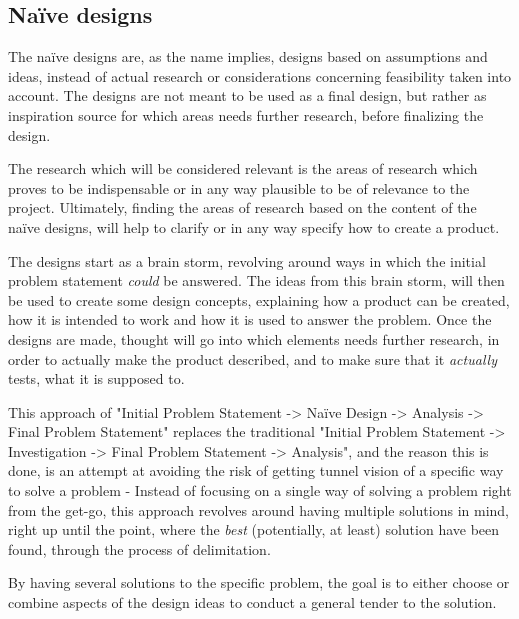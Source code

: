 
\subsection{Naïve designs}
The naïve designs are, as the name implies, designs based on assumptions and ideas, instead of actual research or considerations concerning feasibility taken into account. The designs are not meant to be used as a final design, but rather as inspiration source for which areas needs further research, before finalizing the design.

The research which will be considered relevant is the areas of research which proves to be indispensable or in any way plausible to be of relevance to the project. Ultimately, finding the areas of research based on the content of the naïve designs, will help to clarify or in any way specify how to create a product.
\bigskip

The designs start as a brain storm, revolving around ways in which the initial problem statement \textit{could} be answered. The ideas from this brain storm, will then be used to create some design concepts, explaining how a product can be created, how it is intended to work and how it is used to answer the problem. Once the designs are made, thought will go into which elements needs further research, in order to actually make the product described, and to make sure that it \textit{actually} tests, what it is supposed to.
\bigskip

This approach of "Initial Problem Statement -> Naïve Design -> Analysis -> Final Problem Statement" replaces the traditional "Initial Problem Statement -> Investigation -> Final Problem Statement -> Analysis", and the reason this is done, is an attempt at avoiding the risk of getting tunnel vision of a specific way to solve a problem - Instead of focusing on a single way of solving a problem right from the get-go, this approach revolves around having multiple solutions in mind, right up until the point, where the \textit{best} (potentially, at least) solution have been found, through the process of delimitation. 

By having several solutions to the specific problem, the goal is to either choose or combine aspects of the design ideas to conduct a general tender to the solution.
